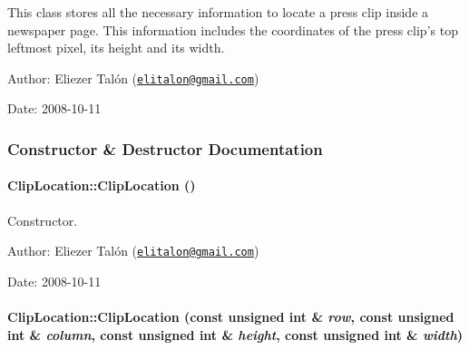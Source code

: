 This class stores all the necessary information to locate a press clip inside a newspaper page. This information includes the coordinates of the press clip's top leftmost pixel, its height and its width.

\begin{Desc}
\item[Author:]Eliezer Talón (\href{mailto:elitalon@gmail.com}{\tt elitalon@gmail.com}) \end{Desc}
\begin{Desc}
\item[Date:]2008-10-11 \end{Desc}


\subsubsection{Constructor \& Destructor Documentation}
\hypertarget{class_clip_location_fb51ec03e0a8f9b33f4d785550bc6b84}{
\paragraph[{ClipLocation}]{\setlength{\rightskip}{0pt plus 5cm}ClipLocation::ClipLocation ()}\hfill}
\label{class_clip_location_fb51ec03e0a8f9b33f4d785550bc6b84}


Constructor. 

\begin{Desc}
\item[Author:]Eliezer Talón (\href{mailto:elitalon@gmail.com}{\tt elitalon@gmail.com}) \end{Desc}
\begin{Desc}
\item[Date:]2008-10-11 \end{Desc}
\hypertarget{class_clip_location_b41ff36c161d2d909c6e75474f5f2f31}{
\paragraph[{ClipLocation}]{\setlength{\rightskip}{0pt plus 5cm}ClipLocation::ClipLocation (const unsigned int \& {\em row}, \/  const unsigned int \& {\em column}, \/  const unsigned int \& {\em height}, \/  const unsigned int \& {\em width})}\hfill}
\label{class_clip_location_b41ff36c161d2d909c6e75474f5f2f31}


